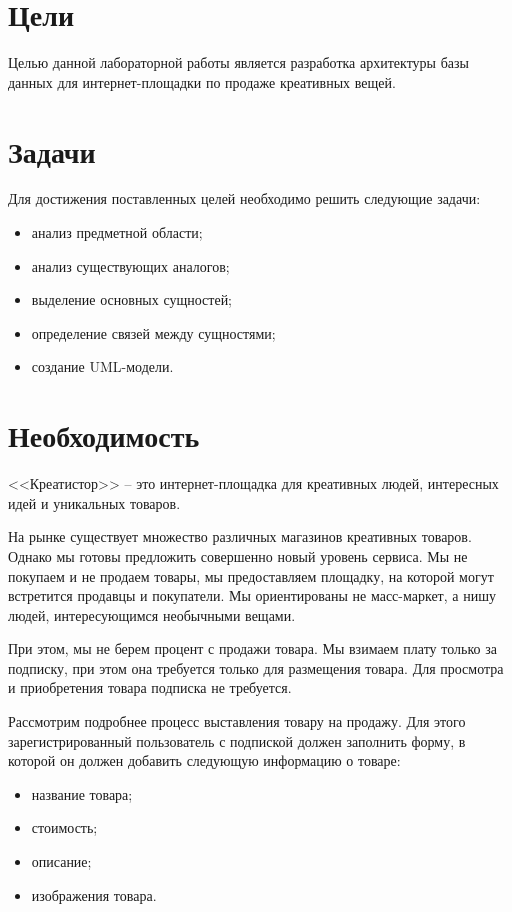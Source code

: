 \documentclass[a4paper,14pt]{extarticle}
\begin{document}
\section{Цели}

Целью данной лабораторной работы является разработка архитектуры базы данных для интернет-площадки по продаже креативных вещей.

\section{Задачи}

Для достижения поставленных целей необходимо решить следующие задачи:
\begin{itemize}
    \item анализ предметной области;
    \item анализ существующих аналогов;
    \item выделение основных сущностей;
    \item определение связей между сущностями;
    \item создание UML-модели.
\end{itemize}

\section{Необходимость}

<<Креатистор>> -- это интернет-площадка для креативных людей, интересных идей и уникальных товаров.

На рынке существует множество различных магазинов креативных товаров. Однако мы готовы предложить совершенно новый уровень сервиса. Мы не покупаем и не продаем товары, мы предоставляем площадку, на которой могут встретится продавцы и покупатели. Мы ориентированы не масс-маркет, а нишу людей, интересующимся необычными вещами.

При этом, мы не берем процент с продажи товара. Мы взимаем плату только за подписку, при этом она требуется только для размещения товара. Для просмотра и приобретения товара подписка не требуется.

Рассмотрим подробнее процесс выставления товару на продажу. Для этого зарегистрированный пользователь с подпиской должен заполнить форму, в которой он должен добавить следующую информацию о товаре:
\begin{itemize}
    \item название товара;
    \item стоимость;
    \item описание;
    \item изображения товара.
\end{itemize}
\end{document}
